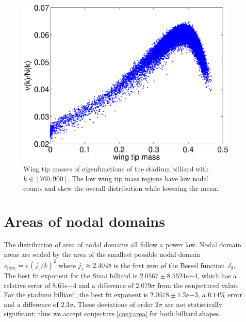 \documentclass{report}
\begin{document}
\begin{figure}
  \begin{center}
    \includegraphics[width=\textwidth]{figs/results/qust_700_to_900_wtms.eps}
    \caption{Wing tip masses of eigenfunctions of the stadium billiard with $k \in [700, 900]$. The low wing tip mass regions have low nodal counts and skew the overall distribution while lowering the mean.}
    \label{fig:wtms}
  \end{center}
\end{figure}

\section{Areas of nodal domains}
The distribution of area of nodal domains all follow a power law. Nodal domain areas are scaled by the area of the smallest possible nodal domain $s_{min} = \pi (j_{1} / k)^{2}$ where $j_{1} \approx 2.4048$ is the first zero of the Bessel function $J_{0}$. The best fit exponent for the Sinai billiard is $2.0567 \pm 8.5524e{-4}$, which has a relative error of $8.65e{-4}$ and a difference of $2.079 \sigma$ from the conjectured value. For the stadium billiard, the best fit exponent is $2.0578 \pm 1.2e{-3}$, a $0.14\%$ error and a difference of $2.3 \sigma$. These deviations of order $2 \sigma$ are not statistically significant; thus we accept conjecture \ref{conj:area} for both billiard shapes.
\end{document}
